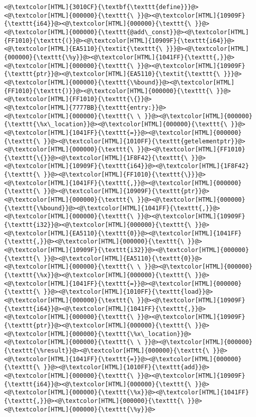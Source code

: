 \begin{lstlisting}
<@\textcolor[HTML]{3010CF}{\textbf{\texttt{define}}}@><@\textcolor[HTML]{000000}{\texttt{\ }}@><@\textcolor[HTML]{10909F}{\texttt{i64}}@><@\textcolor[HTML]{000000}{\texttt{\ }}@><@\textcolor[HTML]{000000}{\texttt{@add\_const}}@><@\textcolor[HTML]{FF1010}{\texttt{(}}@><@\textcolor[HTML]{10909F}{\texttt{i64}}@><@\textcolor[HTML]{EA5110}{\textit{\texttt{\ }}}@><@\textcolor[HTML]{000000}{\texttt{\%y}}@><@\textcolor[HTML]{1041FF}{\texttt{,}}@><@\textcolor[HTML]{000000}{\texttt{\ }}@><@\textcolor[HTML]{10909F}{\texttt{ptr}}@><@\textcolor[HTML]{EA5110}{\textit{\texttt{\ }}}@><@\textcolor[HTML]{000000}{\texttt{\%bound}}@><@\textcolor[HTML]{FF1010}{\texttt{)}}@><@\textcolor[HTML]{000000}{\texttt{\ }}@><@\textcolor[HTML]{FF1010}{\texttt{\{}}@>
<@\textcolor[HTML]{7777BB}{\texttt{entry:}}@>
<@\textcolor[HTML]{000000}{\texttt{\ \ }}@><@\textcolor[HTML]{000000}{\texttt{\%x\_location}}@><@\textcolor[HTML]{000000}{\texttt{\ }}@><@\textcolor[HTML]{1041FF}{\texttt{=}}@><@\textcolor[HTML]{000000}{\texttt{\ }}@><@\textcolor[HTML]{1010FF}{\texttt{getelementptr}}@><@\textcolor[HTML]{000000}{\texttt{\ }}@><@\textcolor[HTML]{FF1010}{\texttt{\{}}@><@\textcolor[HTML]{1F8F42}{\texttt{\ }}@><@\textcolor[HTML]{10909F}{\texttt{i64}}@><@\textcolor[HTML]{1F8F42}{\texttt{\ }}@><@\textcolor[HTML]{FF1010}{\texttt{\}}}@><@\textcolor[HTML]{1041FF}{\texttt{,}}@><@\textcolor[HTML]{000000}{\texttt{\ }}@><@\textcolor[HTML]{10909F}{\texttt{ptr}}@><@\textcolor[HTML]{000000}{\texttt{\ }}@><@\textcolor[HTML]{000000}{\texttt{\%bound}}@><@\textcolor[HTML]{1041FF}{\texttt{,}}@><@\textcolor[HTML]{000000}{\texttt{\ }}@><@\textcolor[HTML]{10909F}{\texttt{i32}}@><@\textcolor[HTML]{000000}{\texttt{\ }}@><@\textcolor[HTML]{EA5110}{\texttt{0}}@><@\textcolor[HTML]{1041FF}{\texttt{,}}@><@\textcolor[HTML]{000000}{\texttt{\ }}@><@\textcolor[HTML]{10909F}{\texttt{i32}}@><@\textcolor[HTML]{000000}{\texttt{\ }}@><@\textcolor[HTML]{EA5110}{\texttt{0}}@>
<@\textcolor[HTML]{000000}{\texttt{\ \ }}@><@\textcolor[HTML]{000000}{\texttt{\%x}}@><@\textcolor[HTML]{000000}{\texttt{\ }}@><@\textcolor[HTML]{1041FF}{\texttt{=}}@><@\textcolor[HTML]{000000}{\texttt{\ }}@><@\textcolor[HTML]{1010FF}{\texttt{load}}@><@\textcolor[HTML]{000000}{\texttt{\ }}@><@\textcolor[HTML]{10909F}{\texttt{i64}}@><@\textcolor[HTML]{1041FF}{\texttt{,}}@><@\textcolor[HTML]{000000}{\texttt{\ }}@><@\textcolor[HTML]{10909F}{\texttt{ptr}}@><@\textcolor[HTML]{000000}{\texttt{\ }}@><@\textcolor[HTML]{000000}{\texttt{\%x\_location}}@>
<@\textcolor[HTML]{000000}{\texttt{\ \ }}@><@\textcolor[HTML]{000000}{\texttt{\%result}}@><@\textcolor[HTML]{000000}{\texttt{\ }}@><@\textcolor[HTML]{1041FF}{\texttt{=}}@><@\textcolor[HTML]{000000}{\texttt{\ }}@><@\textcolor[HTML]{1010FF}{\texttt{add}}@><@\textcolor[HTML]{000000}{\texttt{\ }}@><@\textcolor[HTML]{10909F}{\texttt{i64}}@><@\textcolor[HTML]{000000}{\texttt{\ }}@><@\textcolor[HTML]{000000}{\texttt{\%x}}@><@\textcolor[HTML]{1041FF}{\texttt{,}}@><@\textcolor[HTML]{000000}{\texttt{\ }}@><@\textcolor[HTML]{000000}{\texttt{\%y}}@>

\end{lstlisting}
